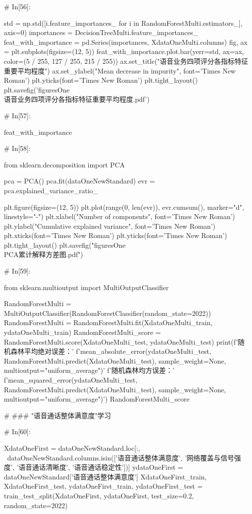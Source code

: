 \documentclass{MathorCupmodeling}
\begin{document}
\begin{python}
	# In[56]:
	
	
	std = np.std([i.feature_importances_ for i in RandomForestMulti.estimators_], axis=0)
	importances = DecisionTreeMulti.feature_importances_
	feat_with_importance = pd.Series(importances, XdataOneMulti.columns)
	fig, ax = plt.subplots(figsize=(12, 5))
	feat_with_importance.plot.bar(yerr=std, ax=ax, color=(5 / 255, 127 / 255, 215 / 255))
	ax.set_title("语音业务四项评分各指标特征重要平均程度")
	ax.set_ylabel("Mean decrease in impurity", font='Times New Roman')
	plt.yticks(font='Times New Roman')
	plt.tight_layout()
	plt.savefig('figuresOne\\[附件1]语音业务四项评分各指标特征重要平均程度.pdf')
	
	# In[57]:
	
	
	feat_with_importance
	
	# In[58]:
	
	
	from sklearn.decomposition import PCA
	
	pca = PCA()
	pca.fit(dataOneNewStandard)
	evr = pca.explained_variance_ratio_
	
	plt.figure(figsize=(12, 5))
	plt.plot(range(0, len(evr)), evr.cumsum(), marker="d", linestyle="-")
	plt.xlabel("Number of components", font='Times New Roman')
	plt.ylabel("Cumulative explained variance", font='Times New Roman')
	plt.xticks(font='Times New Roman')
	plt.yticks(font='Times New Roman')
	plt.tight_layout()
	plt.savefig("figuresOne\\[附件1]PCA累计解释方差图.pdf")
	
	# In[59]:
	
	
	from sklearn.multioutput import MultiOutputClassifier
	
	RandomForestMulti = MultiOutputClassifier(RandomForestClassifier(random_state=2022))
	RandomForestMulti = RandomForestMulti.fit(XdataOneMulti_train, ydataOneMulti_train)
	RandomForestMulti_score = RandomForestMulti.score(XdataOneMulti_test, ydataOneMulti_test)
	print(f'随机森林平均绝对误差：'
		  f'{mean_absolute_error(ydataOneMulti_test, RandomForestMulti.predict(XdataOneMulti_test), sample_weight=None, multioutput="uniform_average")}\n'
		  f'随机森林均方误差：'
		  f'{mean_squared_error(ydataOneMulti_test, RandomForestMulti.predict(XdataOneMulti_test), sample_weight=None, multioutput="uniform_average")}')
	RandomForestMulti_score
	
	# ### "语音通话整体满意度"学习
	
	# In[60]:
	
	
	XdataOneFirst = dataOneNewStandard.loc[:, ~dataOneNewStandard.columns.isin(['语音通话整体满意度', '网络覆盖与信号强度', '语音通话清晰度', '语音通话稳定性'])]
	ydataOneFirst = dataOneNewStandard['语音通话整体满意度']
	XdataOneFirst_train, XdataOneFirst_test, ydataOneFirst_train, ydataOneFirst_test = train_test_split(XdataOneFirst, ydataOneFirst, test_size=0.2, random_state=2022)
	

\end{python}
\end{document}
